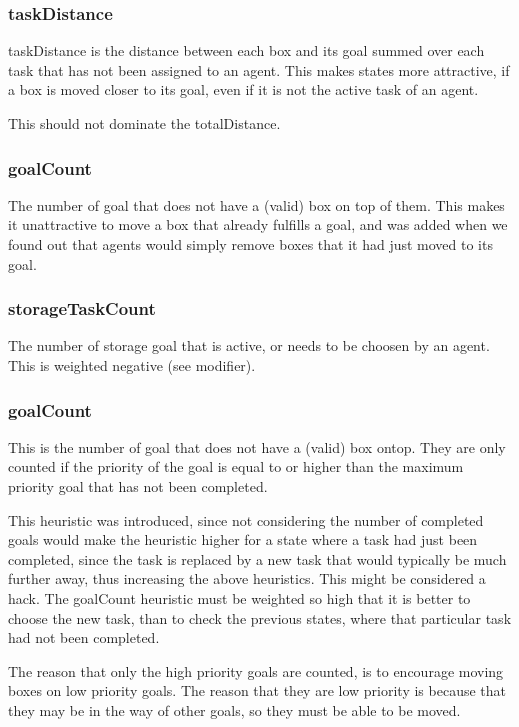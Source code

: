 \documentclass[letterpaper]{article}
\begin{document}
\subsubsection{taskDistance}
taskDistance is the distance between each box and its goal summed over each task
that has not been assigned to an agent. This makes states more attractive, if
a box is moved closer to its goal, even if it is not the active task of an agent.

This should not dominate the totalDistance.

\subsubsection{goalCount}
The number of goal that does not have a (valid) box on top of them. This makes it
unattractive to move a box that already fulfills a goal, and was added when we found
out that agents would simply remove boxes that it had just moved to its goal.

\subsubsection{storageTaskCount}
The number of storage goal that is active, or needs to be choosen by an agent.
This is weighted negative (see modifier).

\subsubsection{goalCount}
This is the number of goal that does not have a (valid) box ontop. They are only
counted if the priority of the goal is equal to or higher than the maximum priority
goal that has not been completed.

This heuristic was introduced, since not considering the number of completed goals
would make the heuristic higher for a state where a task had just been completed,
since the task is replaced by a new task that would typically be much further away,
thus increasing the above heuristics. This might be considered a hack. The goalCount
heuristic must be weighted so high that it is better to choose the new task, than to
check the previous states, where that particular task had not been completed.

The reason that only the high priority goals are counted, is to encourage moving
boxes on low priority goals. The reason that they are low priority is because that
they may be in the way of other goals, so they must be able to be moved.
\end{document}
